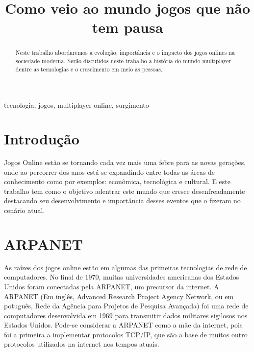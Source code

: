 \documentclass[conference]{ModeloA}
\begin{document}
\title{Como veio ao mundo jogos que não tem pausa}

\author{
\and
}


\maketitle
\begin{abstract}
	Neste trabalho abordaremos a evolução, importância e o impacto dos jogos onlines na sociedade moderna. Serão discutidos neste trabalho a história do mundo multiplayer dentre as tecnologias e o crescimento em meio as pessoas.
\end{abstract}

\begin{IEEEkeywords}
tecnologia, jogos, multiplayer-online, surgimento
\end{IEEEkeywords}


\section{Introdução}
Jogos Online estão se tornando cada vez mais uma febre para as novas gerações, onde ao percorrer dos anos está se expandindo entre todas as áreas de conhecimento como por exemplos: econômica, tecnológica e cultural. E este trabalho tem como o objetivo adentrar este mundo que cresce desenfreadamente destacando seu desenvolvimento e importância desses eventos que o fizeram no cenário atual.


\section{ARPANET}
As raízes dos jogos online estão em algumas das primeiras tecnologias de rede de computadores. No final de 1970, muitas universidades americanas dos Estados Unidos foram conectadas pela ARPANET, um precursor da internet. A ARPANET (Em inglês, Advanced Research Project Agency Network, ou em potuguês, Rede da Agência para Projetos de Pesquisa Avançada) foi uma rede de computadores desenvolvida em 1969 para transmitir dados militares sigilosos nos Estados Unidos. Pode-se considerar a ARPANET como a mãe da internet, pois foi a primeira a implementar protocolos TCP/IP, que são a base de muitos outro protocolos utilizados na internet nos tempos atuais\cite{WikipediaArpanet}.
\end{document}

